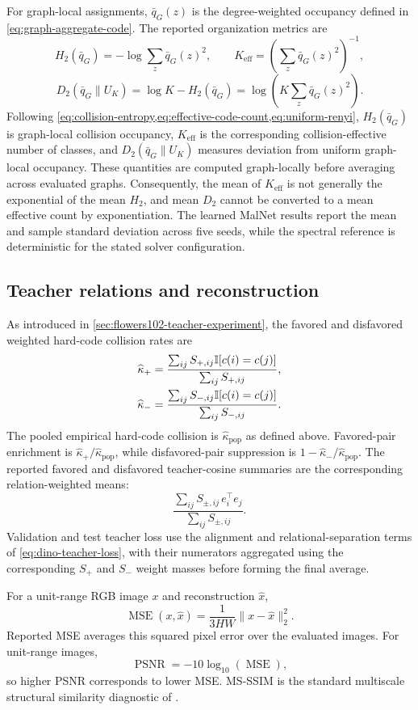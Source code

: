 For graph-local assignments, $\bar q_G(z)$ is the degree-weighted occupancy defined in \cref{eq:graph-aggregate-code}.
The reported organization metrics are
\[
H_2(\bar q_G)
=-\log\sum_z\bar q_G(z)^2,\qquad
K_{\mathrm{eff}}
=\left(\sum_z\bar q_G(z)^2\right)^{-1},
\]
\[
D_2(\bar q_G\|U_K)
=\log K-H_2(\bar q_G)
=\log\left(K\sum_z\bar q_G(z)^2\right).
\]
Following \cref{eq:collision-entropy,eq:effective-code-count,eq:uniform-renyi}, $H_2(\bar q_G)$ is graph-local collision occupancy, $K_{\mathrm{eff}}$ is the corresponding collision-effective number of classes, and $D_2(\bar q_G\|U_K)$ measures deviation from uniform graph-local occupancy.
These quantities are computed graph-locally before averaging across evaluated graphs.
Consequently, the mean of $K_{\mathrm{eff}}$ is not generally the exponential of the mean $H_2$, and mean $D_2$ cannot be converted to a mean effective count by exponentiation.
The learned MalNet results report the mean and sample standard deviation across five seeds, while the spectral reference is deterministic for the stated solver configuration.

\subsection{Teacher relations and reconstruction}

As introduced in \cref{sec:flowers102-teacher-experiment}, the favored and disfavored weighted hard-code collision rates are
\begin{equation}
\begin{aligned}
\widehat\kappa_+&=\frac{\sum_{ij}S_{+,ij}\mathbb{I}[c(i)=c(j)]}{\sum_{ij}S_{+,ij}},\\
\widehat\kappa_-&=\frac{\sum_{ij}S_{-,ij}\mathbb{I}[c(i)=c(j)]}{\sum_{ij}S_{-,ij}}.
\end{aligned}
\end{equation}
The pooled empirical hard-code collision is $\widehat\kappa_{\mathrm{pop}}$ as defined above.
Favored-pair enrichment is $\widehat\kappa_+/\widehat\kappa_{\mathrm{pop}}$, while disfavored-pair suppression is $1-\widehat\kappa_-/\widehat\kappa_{\mathrm{pop}}$.
The reported favored and disfavored teacher-cosine summaries are the corresponding relation-weighted means:
\[
\frac{\sum_{ij}S_{\pm,ij}\,e_i^\top e_j}
{\sum_{ij}S_{\pm,ij}}.
\]
Validation and test teacher loss use the alignment and relational-separation terms of \cref{eq:dino-teacher-loss}, with their numerators aggregated using the corresponding $S_+$ and $S_-$ weight masses before forming the final average.

For a unit-range RGB image $x$ and reconstruction $\widehat x$,
\[
\operatorname{MSE}(x,\widehat x)
=\frac{1}{3HW}\|x-\widehat x\|_2^2.
\]
Reported MSE averages this squared pixel error over the evaluated images.
For unit-range images,
\[
\operatorname{PSNR}
=-10\log_{10}(\operatorname{MSE}),
\]
so higher PSNR corresponds to lower MSE.
MS-SSIM is the standard multiscale structural similarity diagnostic of \citet{wang2003multiscale}.


